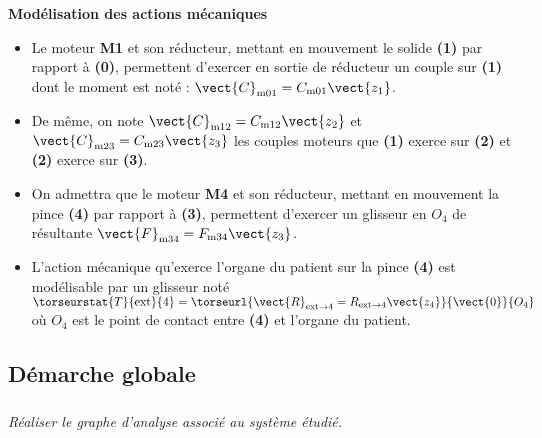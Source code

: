\begin{multicols}{2}
\noindent\textbf{Modélisation des actions mécaniques}
\begin{itemize}
\item Le moteur \textbf{M1} et son réducteur, mettant en mouvement le solide \textbf{(1)} par rapport à \textbf{(0)}, permettent d’exercer en sortie de réducteur un couple sur \textbf{(1)} dont le moment est noté : $\vect{C}_{\text{m01}}=C_{\text{m01}}\vect{z_1}$.
\item De même, on note $\vect{C}_{\text{m12}}=C_{\text{m12}}\vect{z_2}$ et $\vect{C}_{\text{m23}}=C_{\text{m23}}\vect{z_3}$ les couples moteurs que \textbf{(1)} exerce sur \textbf{(2)} et \textbf{(2)} exerce sur \textbf{(3)}. 

\item On admettra que le moteur \textbf{M4} et son réducteur, mettant en mouvement la pince \textbf{(4)} par rapport à \textbf{(3)}, permettent d’exercer un glisseur en $O_4$ de résultante
$\vect{F}_{\text{m34}}=F_{\text{m34}}\vect{z_3}$.
\item L’action mécanique qu’exerce l’organe du patient sur la pince \textbf{(4)} est modélisable par un glisseur noté $\torseurstat{T}{\text{ext}}{4}=\torseurl{\vect{R}_{\text{ext}\to 4}=R_{\text{ext}\to 4}\vect{z_4}}{\vect{0}}{O_4}$ où $O_4$ est le point de contact entre \textbf{(4)} et l'organe du patient. 
\end{itemize}

\fi
\subsection*{Démarche globale}


\subparagraph{}
\textit{Réaliser le graphe d'analyse associé au système étudié.}
\ifprof
\begin{corrige}~\\


\end{corrige}
\end{multicols}
